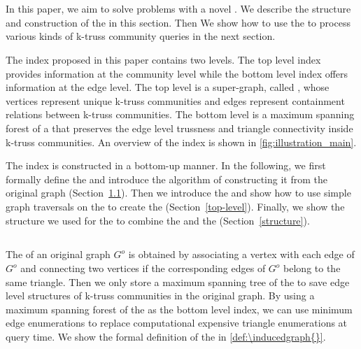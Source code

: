 \section{\TwoLevelIndex{}}
\label{index}

In this paper, we aim to solve \probdef{} problems with a novel \twolevelindex{}. We describe the structure and construction of the \twolevelindex{} in this section. Then We show how to use the \twolevelindex{} to process various kinds of k-truss community queries in the next section.

The index proposed in this paper contains two levels. The top level index provides information at the community level while the bottom level index offers information at the edge level. The top level is a super-graph, called \treeindex{}, whose vertices represent unique k-truss communities and edges represent containment relations between k-truss communities. The bottom level is a maximum spanning forest of a \inducedgraph{} that preserves the edge level trussness and triangle connectivity inside k-truss communities. An overview of the index is shown in \autoref{fig:illustration_main}. 

The index is constructed in a bottom-up manner. In the following, we first formally define the \inducedgraph{} and introduce the algorithm of constructing it from the original graph (Section~\ref{bottom-level}). Then we introduce the \treeindex{} and show how to use simple graph traversals on the \inducedgraph{} to create the \treeindex{} (Section~\ref{top-level}). Finally, we show the structure we used for the \twolevelindex{} to combine the \inducedgraph{} and the \treeindex{} (Section~\ref{structure}).

\subsection{\InducedGraph{}}
\label{bottom-level}
The \inducedgraph{} of an original graph $G^o$ is obtained by associating a vertex with each edge of $G^o$ and connecting two vertices if the corresponding edges of $G^o$ belong to the same triangle. Then we only store a maximum spanning tree of the \inducedgraph{} to save edge level structures of k-truss communities in the original graph. By using a maximum spanning forest of the \inducedgraph{} as the bottom level index, we can use minimum edge enumerations to replace computational expensive triangle enumerations at query time. We show the formal definition of the \inducedgraph{} in \autoref{def:\inducedgraph{}}.

